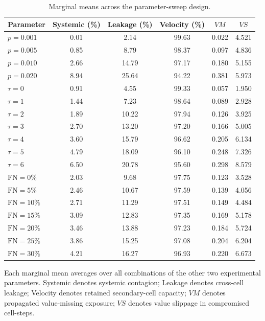 \begin{table}[t]
\centering
\caption{Marginal means across the parameter-sweep design.}
\label{tab:marginal-means}
\begin{tabular}{lccccc}
\hline
Parameter & Systemic (\%) & Leakage (\%) & Velocity (\%) & $VM$ & $VS$ \\
\hline
$p=0.001$ & 0.01 & 2.14 & 99.63 & 0.022 & 4.521 \\
$p=0.005$ & 0.85 & 8.79 & 98.37 & 0.097 & 4.836 \\
$p=0.010$ & 2.66 & 14.79 & 97.17 & 0.180 & 5.155 \\
$p=0.020$ & 8.94 & 25.64 & 94.22 & 0.381 & 5.973 \\
$\tau=0$ & 0.91 & 4.55 & 99.33 & 0.057 & 1.950 \\
$\tau=1$ & 1.44 & 7.23 & 98.64 & 0.089 & 2.928 \\
$\tau=2$ & 1.89 & 10.22 & 97.94 & 0.126 & 3.925 \\
$\tau=3$ & 2.70 & 13.20 & 97.20 & 0.166 & 5.005 \\
$\tau=4$ & 3.60 & 15.79 & 96.62 & 0.205 & 6.134 \\
$\tau=5$ & 4.79 & 18.09 & 96.10 & 0.248 & 7.326 \\
$\tau=6$ & 6.50 & 20.78 & 95.60 & 0.298 & 8.579 \\
$\mathrm{FN}=0\%$ & 2.03 & 9.68 & 97.75 & 0.123 & 3.528 \\
$\mathrm{FN}=5\%$ & 2.46 & 10.67 & 97.59 & 0.139 & 4.056 \\
$\mathrm{FN}=10\%$ & 2.71 & 11.29 & 97.51 & 0.149 & 4.484 \\
$\mathrm{FN}=15\%$ & 3.09 & 12.83 & 97.35 & 0.169 & 5.178 \\
$\mathrm{FN}=20\%$ & 3.46 & 13.88 & 97.23 & 0.184 & 5.724 \\
$\mathrm{FN}=25\%$ & 3.86 & 15.25 & 97.08 & 0.204 & 6.204 \\
$\mathrm{FN}=30\%$ & 4.21 & 16.27 & 96.93 & 0.220 & 6.673 \\
\hline
\end{tabular}
\begin{flushleft}
\footnotesize
Each marginal mean averages over all combinations of the other two experimental parameters. Systemic denotes systemic contagion; Leakage denotes cross-cell leakage; Velocity denotes retained secondary-cell capacity; $VM$ denotes propagated value-missing exposure; $VS$ denotes value slippage in compromised cell-steps.
\end{flushleft}
\end{table}
